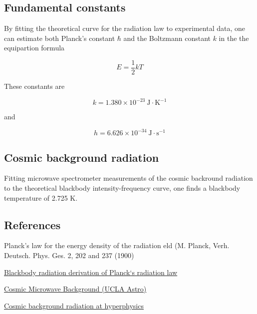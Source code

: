 

\subsection{Fundamental constants}

By fitting the theoretical curve for the radiation law to experimental data, one can estimate both Planck's constant $\hbar$ and the Boltzmann constant $k$ in the the equipartion formula

$$
E = \frac{1}{2} kT
$$

These constants are

$$ k = 1.380 \times 10^{-23}\ \text{J}\cdot\text{K}^{-1}$$

and

$$ h = 6.626 \times 10^{-34}\ \text{J}\cdot\text{s}^{-1}$$

\subsection{Cosmic background radiation}

Fitting microwave spectrometer measurements of the cosmic backround radiation to the theoretical blackbody intensity-frequency curve, one finds a blackbody temperature of 2.725 K.



\subsection{References}

Planck's law for the energy density of the radiation eld (M.
Planck, Verh. Deutsch. Phys. Ges. 2, 202 and 237 (1900)

\href{https://www.chemie.unibas.ch/~tulej/Spectroscopy_related_aspects/Lecture7_Spec_Rel_Asp.pdf}{Blackbody radiation
derivation of Planck‘s radiation law}

\href{http://www.astro.ucla.edu/~wright/CMB.html}{Cosmic Microwave Background (UCLA Astro)}

\href{http://hyperphysics.phy-astr.gsu.edu/hbase/bkg3k.html}{Cosmic background radiation at hyperphysics}
